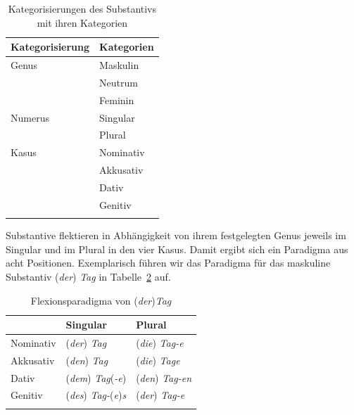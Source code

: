\begin{table}
  \centering
  \begin{tabular}{l l}
    \lsptoprule
    Kategorisierung & Kategorien \\
    \hline
    Genus & Maskulin \\
    & Neutrum \\
    & Feminin \\
    Numerus & Singular \\
    & Plural \\
    Kasus & Nominativ \\
    & Akkusativ \\
    & Dativ \\
    & Genitiv \\
    \lspbottomrule 
  \end{tabular}
  \caption{Kategorisierungen des Substantivs mit ihren Kategorien}
  \label{tab:N_Kategorisierung_Kategorien}
\end{table}  

Substantive flektieren in Abhängigkeit von ihrem festgelegten Genus jeweils im Singular und im Plural in den vier Kasus. Damit ergibt sich ein Paradigma aus acht Positionen. Exemplarisch führen wir das Paradigma für das maskuline Substantiv (\textit{der}) \textit{Tag} in Tabelle~\ref{tab:Flexionsparadigma_Tag} auf.

\begin{table}
  \centering
  \begin{tabular}{l l l}
    \lsptoprule
    & Singular & Plural \\
    \hline
    Nominativ & (\textit{der}) \textit{Tag}  & (\textit{die}) \textit{Tag-e} \\
    
    Akkusativ & (\textit{den}) \textit{Tag}  & (\textit{die}) \textit{Tage} \\
    
    Dativ & (\textit{dem}) \textit{Tag}(\textit{-e}) & (\textit{den}) \textit{Tag-en} \\
    
    Genitiv & (\textit{des}) \textit{Tag-}(\textit{e})\textit{s} & (\textit{der}) \textit{Tag-e} \\
    \lspbottomrule 
  \end{tabular}
  \caption{Flexionsparadigma von (\textit{der})\textit{Tag}}
  \label{tab:Flexionsparadigma_Tag}
\end{table}

